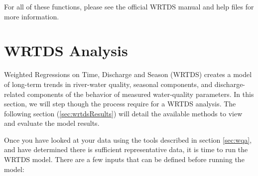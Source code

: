 \documentclass[a4paper,11pt]{article}
\begin{document}
For all of these functions, please see the official WRTDS manual and help files for more information.

\section{WRTDS Analysis}
\label{sec:wrtds}
Weighted Regressions on Time, Discharge and Season (WRTDS) creates a model of long-term trends in river-water quality, seasonal components, and discharge-related components of the behavior of measured water-quality parameters. In this section, we will step though the process require for a WRTDS analysis. The following section (\ref{sec:wrtdsResults}) will detail the available methods to view and evaluate the model results. 

Once you have looked at your data using the tools described in section \ref{sec:wqa}, and have determined there is sufficient representative data, it is time to run the WRTDS model. There are a few inputs that can be defined before running the model:
\end{document}
